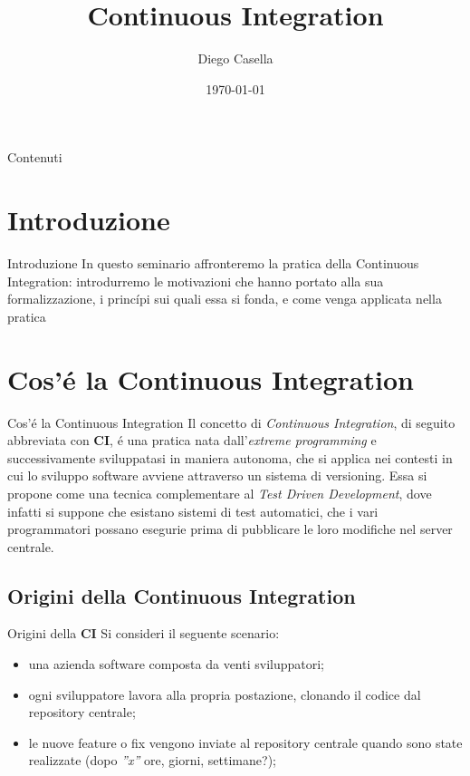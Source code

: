 \documentclass{beamer}
\title{Continuous Integration}
\author{Diego Casella}
\date{\today}
\begin{document}
\maketitle

\begin{frame}{Contenuti} %
\tableofcontents
\end{frame}

\section{Introduzione}
\begin{frame}{Introduzione}
In questo seminario affronteremo la pratica della Continuous Integration: introdurremo le motivazioni che hanno portato alla sua formalizzazione, i princ\'ipi sui quali essa si fonda, e come venga applicata nella pratica
\end{frame}

\section{Cos'\'e la Continuous Integration}
\begin{frame}{Cos'\'e la Continuous Integration}
Il concetto di \emph{Continuous Integration}, di seguito abbreviata con \textbf{CI}, \'e una pratica nata dall'\emph{extreme programming} e successivamente sviluppatasi in maniera autonoma, che si applica nei contesti in cui lo sviluppo software avviene attraverso un sistema di versioning.
\newline
Essa si propone come una tecnica complementare al \emph{Test Driven Development}, dove infatti si suppone che esistano
sistemi di test automatici, che i vari programmatori possano esegurie prima di pubblicare le loro modifiche nel server centrale.
\end{frame}


\subsection{Origini della Continuous Integration}
\begin{frame}{Origini della \textbf{CI}}
Si consideri il seguente scenario:
\begin{itemize}
\item una azienda software composta da venti sviluppatori;
\item ogni sviluppatore lavora alla propria postazione, clonando il codice dal repository centrale;
\item le nuove feature o fix vengono inviate al repository centrale	quando sono state realizzate (dopo \emph{''x''} ore, giorni, settimane?);
\end{itemize}
\end{frame}
\end{document}
